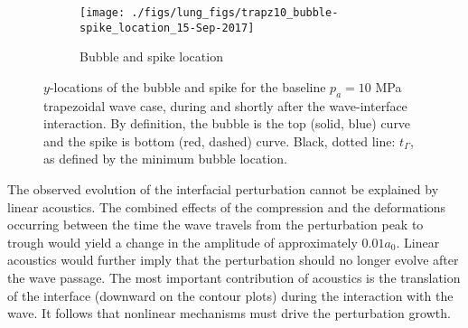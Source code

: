 \begin{figure}
  \centering
  \captionsetup[subfigure]{labelformat=empty}
  \begin{subfigure}[t]{0.45\textwidth}
    \centering
    \texttt{[image: ./figs/lung\_figs/trapz10\_bubble-spike\_location\_15-Sep-2017]}
    \caption{Bubble and spike location}
  \end{subfigure}
  \caption{$y$-locations of the bubble and spike for the baseline
    $p_a = 10$ MPa trapezoidal wave case, during and shortly after the
    wave-interface interaction. By definition, the bubble is the top
    (solid, blue) curve and the spike is bottom (red, dashed)
    curve. Black, dotted line: $t_\Gamma$, as defined by the minimum
    bubble location.}
  \label{fig:trapz10_bs_location}
\end{figure}%


The observed evolution of the interfacial perturbation cannot be
explained by linear acoustics.  The combined effects of the
compression and the deformations occurring between the time the wave
travels from the perturbation peak to trough would yield a change in
the amplitude of approximately $0.01 a_0$. Linear acoustics would
further imply that the perturbation should no longer evolve after the
wave passage. The most important contribution of acoustics is the
translation of the interface (downward on the contour plots) during
the interaction with the wave. It follows that nonlinear mechanisms
must drive the perturbation growth.




